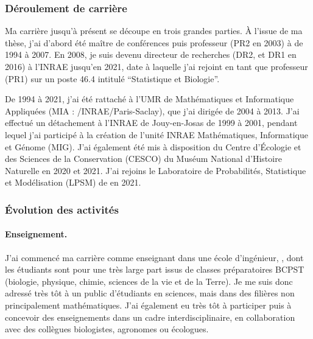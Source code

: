 \subsubsection*{Déroulement de carrière}

Ma carrière jusqu'à présent se découpe en trois grandes parties. À l'issue de ma thèse, j'ai d'abord été maître de conférences puis professeur (PR2 en 2003) à \APT de 1994 à 2007. En 2008, je suis devenu directeur de recherches (DR2, et DR1 en 2016) à l'INRAE jusqu'en 2021, date à laquelle j'ai rejoint \SU en tant que professeur (PR1) sur un poste 46.4 intitulé ``Statistique et Biologie''. 

De 1994 à 2021, j'ai été rattaché à l'UMR de Mathématiques et Informatique Appliquées (MIA : \APT/INRAE/Paris-Saclay), que j'ai dirigée de 2004 à 2013. 
J'ai effectué un détachement à l'INRAE de Jouy-en-Josas de 1999 à 2001, pendant lequel j'ai participé à la création de l'unité INRAE Mathématiques, Informatique et Génome (MIG). 
J'ai également été mis à disposition du Centre d'Écologie et des Sciences de la Conservation (CESCO) du Muséum National d'Histoire Naturelle en 2020 et 2021. J'ai rejoins le Laboratoire de Probabilités, Statistique et Modélisation (LPSM) de \SU en 2021.

\subsubsection*{\'Evolution des activités}

\paragraph{Enseignement.}
J'ai commencé ma carrière comme enseignant dans une école d'ingénieur, \APT, dont les étudiants sont pour une très large part issus de classes préparatoires BCPST (biologie, physique, chimie, sciences de la vie et de la Terre). Je me suis donc adressé très tôt à un public d’étudiants en sciences, mais dans des filières non principalement mathématiques. J’ai également eu très tôt à participer puis à concevoir des enseignements dans un cadre interdisciplinaire, en collaboration avec des collègues biologistes, agronomes ou écologues. 

